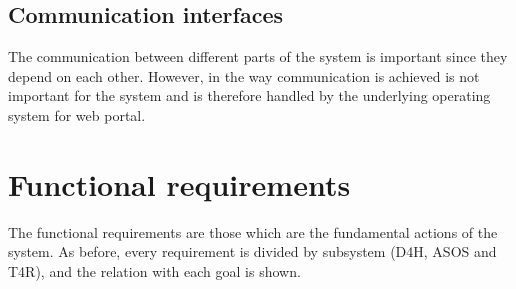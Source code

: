 \documentclass[12pt]{report}
\begin{document}
\subsection{Communication interfaces}
The communication between different parts of the system is important since they depend on each other. However, in the way communication is achieved is not important for the system and is therefore handled by the underlying operating system for web portal.

\section{Functional requirements}
The functional requirements are those which are the fundamental actions of the system. As before, every requirement is divided by subsystem (D4H, ASOS and T4R), and the relation with each goal is shown.
\end{document}

